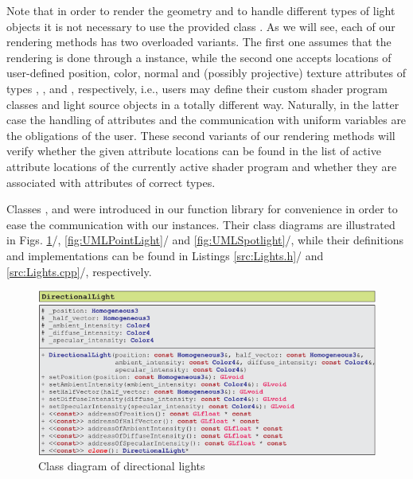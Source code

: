 \documentclass[b5paper, twosided]{book}
\newcommand{\CRed}[1]{{\color[rgb]{0.5, 0.0, 0.0}{#1}}}
\newcommand{\CBlue}[1]{{\color[rgb]{0.0, 0.0, 0.9}{#1}}}
\DeclareRobustCommand{\mref}[1]{\ref{#1}{\relsize{-1}/\pageref{#1}}}
\begin{document}

Note that in order to render the geometry and to handle different types of light objects it is not necessary to use the provided class \CBlue{ShaderProgram}. As we will see, each of our rendering methods has two overloaded variants. The first one assumes that the rendering is done through a \CBlue{ShaderProgram} instance, while the second one accepts locations of user-defined position, color, normal and (possibly projective) texture attributes of types \CRed{vec3}, \CRed{vec4}, \CRed{vec3} and \CRed{vec4}, respectively, i.e., users may define their custom shader program classes and light source objects in a totally different way. Naturally, in the latter case the handling of attributes and the communication with uniform variables are the obligations of the user. These second variants of our rendering methods will verify whether the given attribute locations can be found in the list of active attribute locations of the currently active shader program and whether they are associated with attributes of correct types.

Classes \CBlue{DirectionalLight}, \CBlue{PointLight} and \CBlue{Spotlight} were introduced in our function library for convenience in order to ease the communication with our \CBlue{ShaderProgram} instances. Their class diagrams are illustrated in Figs. \mref{fig:UMLDirectionalLight}, \mref{fig:UMLPointLight} and \mref{fig:UMLSpotlight}, while their definitions and implementations can be found in Listings \mref{src:Lights.h} and \mref{src:Lights.cpp}, respectively.

\begin{figure}[!h]
    \centering
    \includegraphics[]{images/UMLDirectionalLight.pdf}
    \caption{Class diagram of directional lights}
    \label{fig:UMLDirectionalLight}
\end{figure}
\end{document}
